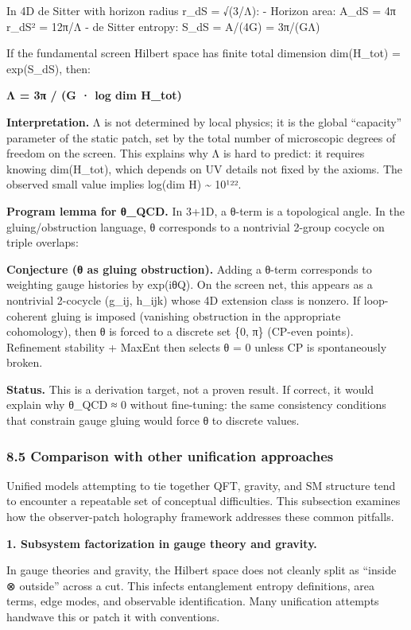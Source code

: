 \documentclass[
]{article}
\begin{document}
In 4D de Sitter with horizon radius r\_dS = √(3/Λ): - Horizon area:
A\_dS = 4π r\_dS² = 12π/Λ - de Sitter entropy: S\_dS = A/(4G) = 3π/(GΛ)

If the fundamental screen Hilbert space has finite total dimension
dim(H\_tot) = exp(S\_dS), then:

\textbf{Λ = 3π / (G · log dim H\_tot)}

\textbf{Interpretation.} Λ is not determined by local physics; it is the
global ``capacity'' parameter of the static patch, set by the total
number of microscopic degrees of freedom on the screen. This explains
why Λ is hard to predict: it requires knowing dim(H\_tot), which depends
on UV details not fixed by the axioms. The observed small value implies
log(dim H) \textasciitilde{} 10¹²².

\textbf{Program lemma for θ\_QCD.} In 3+1D, a θ-term is a topological
angle. In the gluing/obstruction language, θ corresponds to a nontrivial
2-group cocycle on triple overlaps:

\textbf{Conjecture (θ as gluing obstruction).} Adding a θ-term
corresponds to weighting gauge histories by exp(iθQ). On the screen net,
this appears as a nontrivial 2-cocycle (g\_ij, h\_ijk) whose 4D
extension class is nonzero. If loop-coherent gluing is imposed
(vanishing obstruction in the appropriate cohomology), then θ is forced
to a discrete set \{0, π\} (CP-even points). Refinement stability +
MaxEnt then selects θ = 0 unless CP is spontaneously broken.

\textbf{Status.} This is a derivation target, not a proven result. If
correct, it would explain why θ\_QCD ≈ 0 without fine-tuning: the same
consistency conditions that constrain gauge gluing would force θ to
discrete values.

\subsubsection{8.5 Comparison with other unification
approaches}\label{comparison-with-other-unification-approaches}

Unified models attempting to tie together QFT, gravity, and SM structure
tend to encounter a repeatable set of conceptual difficulties. This
subsection examines how the observer-patch holography framework
addresses these common pitfalls.

\textbf{1. Subsystem factorization in gauge theory and gravity.}

In gauge theories and gravity, the Hilbert space does not cleanly split
as ``inside ⊗ outside'' across a cut. This infects entanglement entropy
definitions, area terms, edge modes, and observable identification. Many
unification attempts handwave this or patch it with conventions.
\end{document}
